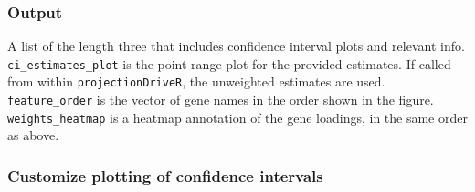 \documentclass[]{article}
\begin{document}
\hypertarget{output-6}{%
\subsubsection{Output}\label{output-6}}

A list of the length three that includes confidence interval plots and relevant info. \texttt{ci\_estimates\_plot} is the point-range plot for the provided estimates. If called from within \texttt{projectionDriveR}, the unweighted estimates are used. \texttt{feature\_order} is the vector of gene names in the order shown in the figure. \texttt{weights\_heatmap} is a heatmap annotation of the gene loadings, in the same order as above.

\hypertarget{customize-plotting-of-confidence-intervals}{%
\subsubsection{Customize plotting of confidence intervals}\label{customize-plotting-of-confidence-intervals}}
\end{document}
